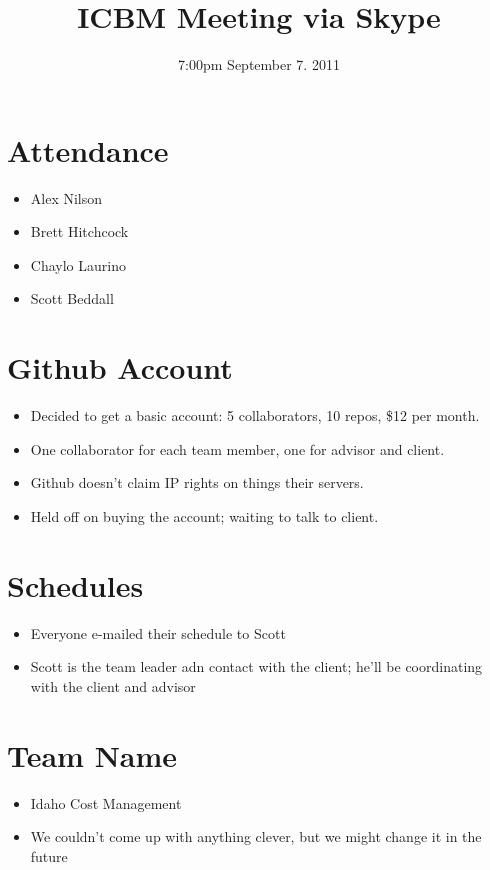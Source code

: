 \documentclass{article}
\begin{document}
\title{ICBM Meeting via Skype}
\date{7:00pm September 7. 2011}
\maketitle

\section{Attendance}
\begin{itemize}
\item Alex Nilson
\item Brett Hitchcock
\item Chaylo Laurino
\item Scott Beddall
\end{itemize}

\section{Github Account}
\begin{itemize}
\item Decided to get a basic account: 5 collaborators, 10 repos, \$12 per month.
\item One collaborator for each team member, one for advisor and client.
\item Github doesn't claim IP rights on things their servers.
\item Held off on buying the account; waiting to talk to client.
\end{itemize}

\section{Schedules}
\begin{itemize}
\item Everyone e-mailed their schedule to Scott
\item Scott is the team leader adn contact with the client; he'll be coordinating with the client and advisor
\end{itemize}

\section{Team Name}
\begin{itemize}
\item Idaho Cost Management
\item We couldn't come up with anything clever, but we might change it in the future
\end{itemize}
\end{document}
